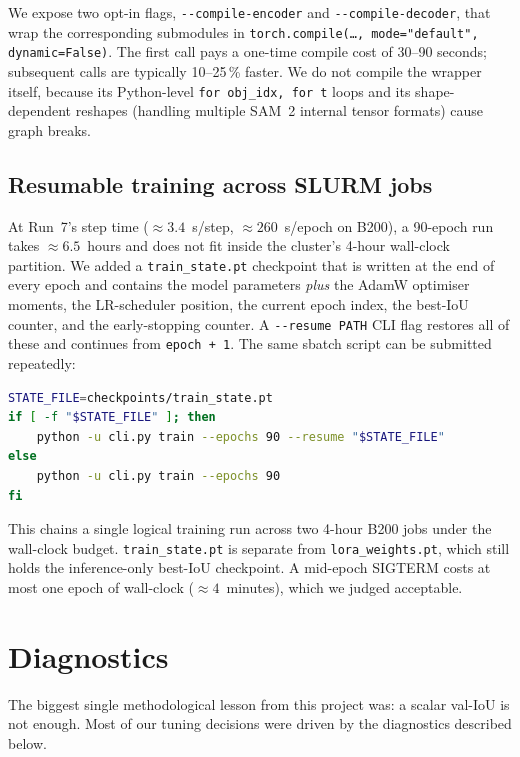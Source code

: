 \documentclass[11pt,a4paper]{article}
\begin{document}
We expose two opt-in flags, \texttt{-{}-compile-encoder} and
\texttt{-{}-compile-decoder}, that wrap the corresponding submodules
in \texttt{torch.compile(\dots,\,mode="default",\,dynamic=False)}. The
first call pays a one-time compile cost of 30--90 seconds; subsequent
calls are typically 10--25\,\% faster. We do not compile the wrapper
itself, because its Python-level \texttt{for obj\_idx, for t} loops
and its shape-dependent reshapes (handling multiple SAM~2 internal
tensor formats) cause graph breaks.

\subsection{Resumable training across SLURM jobs}
\label{sec:resume}

At Run~7's step time ($\approx 3.4$~s/step, $\approx 260$~s/epoch on
B200), a 90-epoch run takes $\approx 6.5$~hours and does not fit
inside the cluster's 4-hour wall-clock partition. We added a
\texttt{train\_state.pt} checkpoint that is written at the end of
every epoch and contains the model parameters \emph{plus} the AdamW
optimiser moments, the LR-scheduler position, the current epoch
index, the best-IoU counter, and the early-stopping counter. A
\texttt{-{}-resume PATH} CLI flag restores all of these and continues
from \texttt{epoch + 1}. The same sbatch script can be submitted
repeatedly:
\begin{lstlisting}[language=bash]
STATE_FILE=checkpoints/train_state.pt
if [ -f "$STATE_FILE" ]; then
    python -u cli.py train --epochs 90 --resume "$STATE_FILE"
else
    python -u cli.py train --epochs 90
fi
\end{lstlisting}
This chains a single logical training run across two 4-hour B200 jobs
under the wall-clock budget. \texttt{train\_state.pt} is separate
from \texttt{lora\_weights.pt}, which still holds the inference-only
best-IoU checkpoint. A mid-epoch SIGTERM costs at most one epoch of
wall-clock ($\approx 4$~minutes), which we judged acceptable.

\section{Diagnostics}

The biggest single methodological lesson from this project was: a
scalar val-IoU is not enough. Most of our tuning decisions were driven
by the diagnostics described below.
\end{document}
